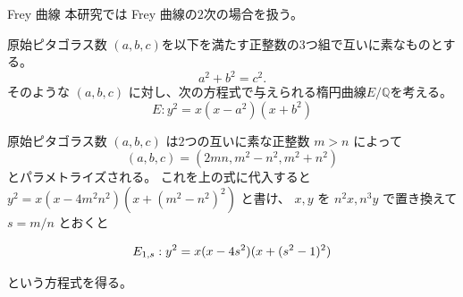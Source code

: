 \documentclass{classes/mybeamer}
\begin{document}


\begin{frame}{Frey 曲線}
    本研究では Frey 曲線の$2$次の場合を扱う。
    \begin{dfn*}
        原始ピタゴラス数 $(a,b,c)$を以下を満たす正整数の$3$つ組で互いに素なものとする。
        \begin{equation}
            \label{eq:pythagorean_triple}
            a^2+b^2=c^2.
        \end{equation}
        そのような $(a,b,c)$ に対し、次の方程式で与えられる楕円曲線$E/\mathbb{Q}$を考える。
        \begin{equation}
            \label{eq:2frey}
            E: y^2 = x (x-a^2) (x+b^2)
        \end{equation}
    \end{dfn*}
    原始ピタゴラス数 $(a,b,c)$ は$2$つの互いに素な正整数 $m > n$ によって
    \begin{equation*}
        (a,b,c) = (2mn, m^{2} - n^{2}, m^{2} + n^{2})
    \end{equation*}
    とパラメトライズされる。
    これを上の式に代入すると $y^{2} = x(x - 4m^2n^2)(x + (m^{2} - n^2)^{2})$ と書け、
    $x,y$ を $n^2x, n^3y$ で置き換えて $s = m/n$ とおくと
    \begin{eg*}
        \begin{equation*}
            \label{eq:E_{1,s}}
            E_{1,s}: y^{2} = x(x - 4s^{2})(x + (s^{2} - 1)^{2})
        \end{equation*}
    \end{eg*}
    という方程式を得る。    
\end{frame}
\end{document}
